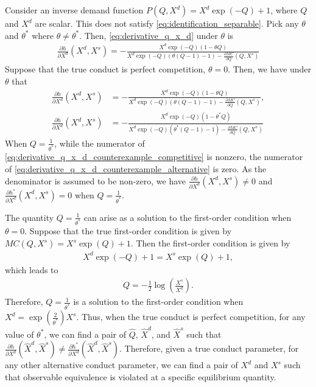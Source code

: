 \documentclass[11pt, a4paper]{article}
\theoremstyle{remark}
\begin{document}
Consider an inverse demand function $P(Q,X^{d}) = X^{d}\exp(-Q) + 1$, where $Q$ and $X^{d}$ are scalar.
This does not satisfy \eqref{eq:identification_separable}.
Pick any $\theta$ and $\theta^{*}$ where $\theta \ne \theta^{*}$.
Then, \eqref{eq:derivative_q_x_d} under $\theta$ is
\begin{align}
    \frac{\partial h}{\partial X^{d}}(X^{d}, X^{s})  = - \frac{X^{d}\exp(-Q)(1-\theta Q)}{X^{d}\exp(-Q)(\theta(Q- 1) -1) - \frac{\partial MC}{\partial Q}(Q, X^{s})} 
\end{align}
Suppose that the true conduct is perfect competition, $\theta = 0$.
Then, we have under $\theta$ that 
\begin{align}
    \frac{\partial h}{\partial X^{d}}(X^{d}, X^{s}) & = - \frac{X^{d}\exp(-Q)(1-\theta Q)}{X^{d}\exp(-Q)(\theta(Q- 1) -1) - \frac{\partial MC}{\partial Q}(Q, X^{s})} ,\label{eq:derivative_q_x_d_counterexample_competitive} \\
    \frac{\partial h}{\partial X^{d}}(X^{d}, X^{s})  & = - \frac{X^{d}\exp(-Q)(1-\theta^{*} Q)}{X^{d}\exp(-Q)(\theta^{*}(Q- 1) -1) - \frac{\partial MC}{\partial Q}(Q, X^{s})} \label{eq:derivative_q_x_d_counterexample_alternative}
\end{align}
When $Q = \frac{1}{\theta^{*}}$, while the numerator of \eqref{eq:derivative_q_x_d_counterexample_competitive} is nonzero, the numerator of \eqref{eq:derivative_q_x_d_counterexample_alternative} is zero.
As the denominator is assumed to be non-zero, we have $\frac{\partial h}{\partial X^{d}}(X^{d}, X^{s}) \ne 0$ and $\frac{\partial h^{*}}{\partial X^{d}}(X^{d}, X^{s}) = 0$ when $Q = \frac{1}{\theta^{*}}$.

The quantity $Q = \frac{1}{\theta^{*}}$ can arise as a solution to the first-order condition when $\theta = 0$.
Suppose that the true first-order condition is given by $MC(Q, X^{s}) = X^{s}\exp(Q) + 1$.
Then the first-order condition is given by
\begin{align}
    X^{d}\exp(-Q) + 1 = X^{s}\exp(Q) + 1,
\end{align}
which leads to
\begin{align}
    Q = -\frac{1}{2} \log\left(\frac{X^{s}}{X^{d}}\right).
\end{align}
Therefore, $Q = \frac{1}{\theta^{*}}$ is a solution to the first-order condition when $X^{d} = \exp\left(\frac{2}{\theta^{*}}\right)X^{s}$.
Thus, when the true conduct is perfect competition, for any value of $\theta^*$, we can find a pair of $\hat{Q}$, $\hat{X}^{d}$, and $\hat{X}^{s}$ such that $\frac{\partial h}{\partial X^{d}}(\hat{X}^{d}, \hat{X}^{s}) \ne \frac{\partial h^{*}}{\partial X^{d}}(\hat{X}^{d}, \hat{X}^{s})$.
Therefore, given a true conduct parameter, for any other alternative conduct parameter, we can find a pair of $X^{d}$ and $X^{s}$ such that observable equivalence is violated at a specific equilibrium quantity.
\end{document}
